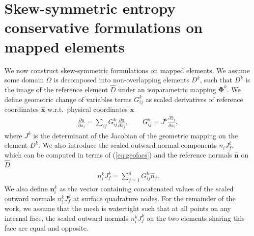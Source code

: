 \documentclass{svjour3}                     %
\renewcommand{\hat}{\widehat}
\newcommand{\pd}[2]{\frac{\partial#1}{\partial#2}}
\begin{document}
\section{Skew-symmetric entropy conservative formulations on mapped elements}
\label{sec:skew2}

We now construct skew-symmetric formulations on mapped elements.  We assume some domain $\Omega$ is decomposed into non-overlapping elements $D^k$, such that $D^k$ is the image of the reference element $\hat{D}$ under an isoparametric mapping $\bm{\Phi}^k$.  We define geometric change of variables terms ${G}^k_{ij}$ as scaled derivatives of reference coordinates $\hat{\bm{x}}$ w.r.t.\ physical coordinates $\bm{x}$
\begin{gather}
\pd{u}{x_i} = \sum_{ij} {G}^k_{ij}\pd{u}{\hat{x}_j}, \qquad {G}^k_{ij} = J^k\pd{\hat{x}_j}{{x}_i}, 
\label{eq:geofacs}
\end{gather}
where $J^k$ is the determinant of the Jacobian of the geometric mapping on the element $D^k$.  We also introduce the scaled outward normal components $n_iJ^k_f$, which can be computed in terms of (\ref{eq:geofacs}) and the reference normals $\hat{\bm{n}}$ on $\hat{D}$
\begin{gather}
n^k_i J^k_f = \sum_{j=1}^d G^k_{ij} \hat{{n}}_j.  
\label{eq:normals}
\end{gather}
We also define $\bm{n}^k_i$ as the vector containing concatenated values of the scaled outward normals $n^k_iJ^k_f$ at surface quadrature nodes.  For the remainder of the work, we assume that the mesh is watertight \cite{chan2018discretely} such that at all points on any internal face, the scaled outward normals $n^k_iJ^k_f$ on the two elements sharing this face are equal and opposite.  

\end{document}
